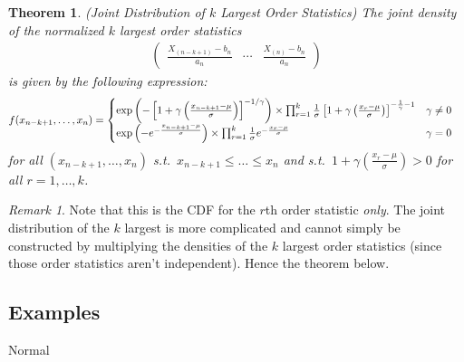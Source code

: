 \documentclass[12pt]{article}
\theoremstyle{plain}
\newtheorem{thm}{Theorem}[section]
\theoremstyle{definition}
\theoremstyle{remark}
\newtheorem*{rmk}{Remark}
\begin{document}
\begin{thm}\emph{(Joint Distribution of $k$ Largest Order Statistics)}
The joint density of the normalized $k$ largest order statistics
\begin{align*}
  \begin{pmatrix}
    \frac{X_{(n-k+1)}-b_n}{a_n}
    & \cdots &
    \frac{X_{(n)}-b_n}{a_n}
  \end{pmatrix}
\end{align*}
is given by the following expression:
\begin{align*}
  f(x_{n-k+1},\ldots,x_n)
  &=
  \begin{cases}
  \exp\left(
    -
    \left[
      1+\gamma\left(\frac{x_{n-k+1}-\mu}{\sigma}\right)
    \right]^{-1/\gamma}
  \right)
  \times
  \prod_{r=1}^k
  \frac{1}{\sigma}
  \left[
    1+\gamma\left(\frac{x_{r}-\mu}{\sigma}\right)
  \right]^{-\frac{1}{\gamma}-1}
  & \gamma\neq 0
  \\
  \exp\left(
    -
    e^{%
      -\frac{x_{n-k+1}-\mu}{\sigma}
    }
  \right)
  \times
  \prod_{r=1}^k
  \frac{1}{\sigma}
  e^{
    - \frac{x_{r}-\mu}{\sigma}
  }
  & \gamma= 0
  \end{cases}
\end{align*}
for all $(x_{n-k+1},\ldots,x_n)$ s.t.\
$x_{n-k+1}\leq \ldots\leq x_n$
and s.t.\
$1+\gamma\left(\frac{x_r-\mu}{\sigma}\right)>0$
for all $r=1,\ldots,k$.
\end{thm}
\begin{rmk}
Note that this is the CDF for the $r$th order statistic \emph{only}.
The joint distribution of the $k$ largest is more complicated and
cannot simply be constructed by multiplying the densities of the $k$
largest order statistics (since those order statistics aren't
independent). Hence the theorem below.
\end{rmk}




\clearpage
\subsection{Examples}

Normal


\clearpage



\clearpage
\end{document}
